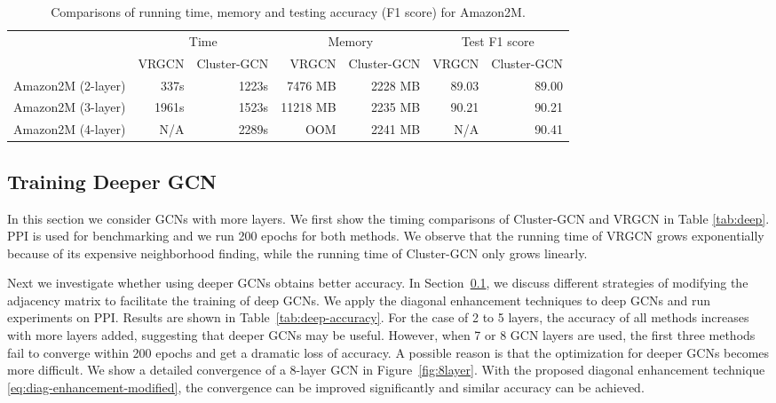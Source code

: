 \documentclass[sigconf]{acmart}
\begin{document}
\begin{table*}
\caption{Comparisons of running time, memory and testing accuracy (F1 score) for Amazon2M.}
\vspace{-10pt}\begin{tabular}{|l|r|r|r|r|r|r|}
\hline
 & \multicolumn{2}{c|}{Time} & \multicolumn{2}{c|}{Memory} & \multicolumn{2}{c|}{Test F1 score} \\ \cline{2-7}
& VRGCN & Cluster-GCN & VRGCN & Cluster-GCN & VRGCN & Cluster-GCN \\
\hline
Amazon2M (2-layer) &  337s   &  1223s        &           7476 MB               &  2228 MB     & 89.03 &  89.00\\
\hline
Amazon2M (3-layer) & 1961s    & 1523s          &                      11218 MB    & 2235 MB      & 90.21         & 90.21\\
\hline
Amazon2M (4-layer) & N/A      & 2289s          & OOM & 2241 MB      & N/A           & 90.41\\
\hline
\end{tabular}
\label{tab:amazon2m}
\end{table*}

\subsection{Training Deeper GCN}
\label{sec:deepgcn}
In this section we consider GCNs with more layers.
We first show the timing comparisons of Cluster-GCN and VRGCN in Table \ref{tab:deep}.
PPI is used for benchmarking and we run 200 epochs for both methods.
We observe that the running time of VRGCN grows exponentially because of its expensive neighborhood finding, while the running time of Cluster-GCN only grows linearly.

Next we investigate whether using deeper GCNs obtains better accuracy.
In Section~\ref{sec:deepgcn}, we discuss different strategies of modifying the adjacency matrix  to facilitate the training of deep GCNs.
We apply the diagonal enhancement techniques to deep GCNs and run experiments on PPI.
Results are shown in Table~\ref{tab:deep-accuracy}.
For the case of 2 to 5 layers, the accuracy of all methods increases with more layers added, suggesting that deeper GCNs may be useful.
However, when 7 or 8 GCN layers are used, the first three methods fail to converge within 200 epochs and get a dramatic loss of accuracy.
A possible reason is that the optimization for deeper GCNs becomes more difficult.
We show a detailed convergence of a 8-layer GCN in Figure~\ref{fig:8layer}.
With the proposed diagonal enhancement technique \eqref{eq:diag-enhancement-modified}, the convergence can be improved significantly and similar accuracy can be achieved. 
\end{document}
